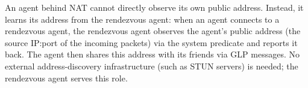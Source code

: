 



An agent behind NAT cannot directly observe its own public address.  Instead, it learns its address from the rendezvous agent: when an agent connects to a rendezvous agent, the rendezvous agent observes the agent's public address (the source IP:port of the incoming packets) via the  system predicate and reports it back.  The agent then shares this address with its friends via GLP messages.  No external address-discovery infrastructure (such as STUN servers) is needed; the rendezvous agent serves this role.

